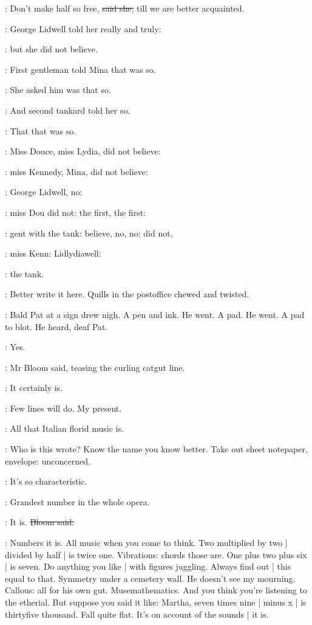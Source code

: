 \MissD:
Don't make half so free,
\sout{said she,}
till we are better acquainted.

:
George Lidwell told her really and truly:

:
but she did not believe.

:
First gentleman told Mina that was so.

:
She asked him was that so.

:
And second tankard told her so.

:
That that was so.

:
Miss Douce,
miss Lydia,
did not believe:

:
miss Kennedy,
Mina,
did not believe:

:
George Lidwell,
no:

:
miss Dou did not:
the first,
the first:

:
gent with the tank:
believe,
no, no:
did not,

:
miss Kenn:
Lidlydiawell:

:
the tank.

\BloomInt:
Better write it here.
Quills in the postoffice chewed and twisted.

:
Bald Pat at a sign drew nigh.
A pen and ink.
He went.
A pad.
He went.
A pad to blot.
He heard,
deaf Pat.

\Bloom:
Yes.

:
Mr Bloom said,
teasing the curling catgut line.

\Bloom:
It certainly is.

\BloomInt:
Few lines will do.
My present.

\Bloom:
All that Italian florid music is.

\BloomInt:
Who is this wrote?
Know the name you know better.
Take out
sheet notepaper,
envelope:
unconcerned.

\Bloom:
It's so characteristic.

\goulding:
Grandest number in the whole opera.

\Bloom:
It is.
\sout{Bloom said.}

\BloomInt:
Numbers it is.
All music when you come to think.
Two multiplied by two |
divided by half |
is twice one.
Vibrations:
chords those are.
One plus two plus six |
is seven.
Do anything you like |
with figures juggling.
Always find out |
this equal to that.
Symmetry under a cemetery wall.
He doesn't see my mourning.
Callous:
all for his own gut.
Musemathematics.
And you think you're listening to the etherial.
But suppose you said it like:
Martha,
seven times nine |
minus x |
is thirtyfive thousand.
Fall quite flat.
It's on account of the sounds |
it is.

